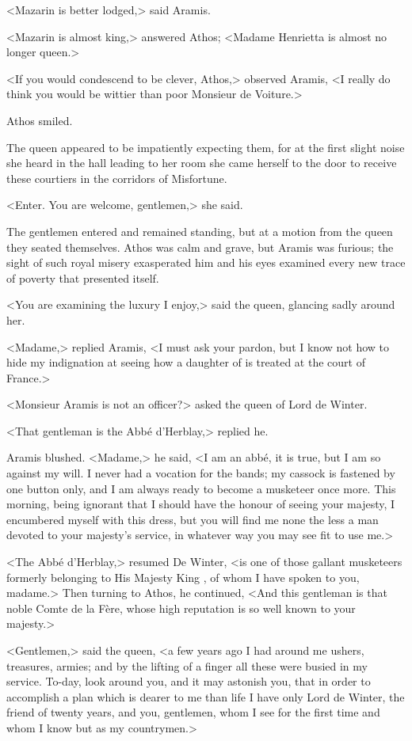 <Mazarin is better lodged,> said Aramis.

<Mazarin is almost king,> answered Athos; <Madame Henrietta is almost no longer queen.>

<If you would condescend to be clever, Athos,> observed Aramis, <I really do think you would be wittier than poor Monsieur de Voiture.>

Athos smiled.

The queen appeared to be impatiently expecting them, for at the first slight noise she heard in the hall leading to her room she came herself to the door to receive these courtiers in the corridors of Misfortune.

<Enter. You are welcome, gentlemen,> she said.

The gentlemen entered and remained standing, but at a motion from the queen they seated themselves. Athos was calm and grave, but Aramis was furious; the sight of such royal misery exasperated him and his eyes examined every new trace of poverty that presented itself.

<You are examining the luxury I enjoy,> said the queen, glancing sadly around her.

<Madame,> replied Aramis, <I must ask your pardon, but I know not how to hide my indignation at seeing how a daughter of  is treated at the court of France.>

<Monsieur Aramis is not an officer?> asked the queen of Lord de Winter.

<That gentleman is the Abbé d'Herblay,> replied he.

Aramis blushed. <Madame,> he said, <I am an abbé, it is true, but I am so against my will. I never had a vocation for the bands; my cassock is fastened by one button only, and I am always ready to become a musketeer once more. This morning, being ignorant that I should have the honour of seeing your majesty, I encumbered myself with this dress, but you will find me none the less a man devoted to your majesty's service, in whatever way you may see fit to use me.>

<The Abbé d'Herblay,> resumed De Winter, <is one of those gallant musketeers formerly belonging to His Majesty King , of whom I have spoken to you, madame.> Then turning to Athos, he continued, <And this gentleman is that noble Comte de la Fère, whose high reputation is so well known to your majesty.>

<Gentlemen,> said the queen, <a few years ago I had around me ushers, treasures, armies; and by the lifting of a finger all these were busied in my service. To-day, look around you, and it may astonish you, that in order to accomplish a plan which is dearer to me than life I have only Lord de Winter, the friend of twenty years, and you, gentlemen, whom I see for the first time and whom I know but as my countrymen.>

